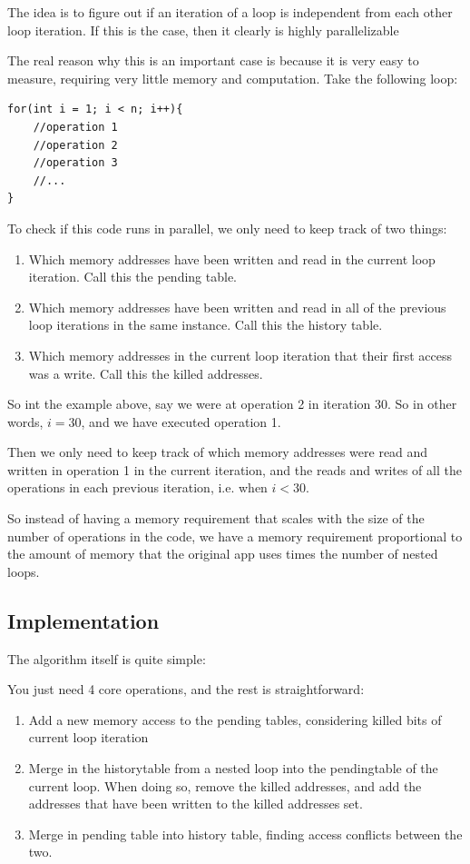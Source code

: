 \documentclass[12pt,twoside]{reedthesis}
\begin{document}
		The idea is to figure out if an iteration of a loop is independent from each other loop iteration. If this is the case, then it clearly is highly parallelizable

		The real reason why this is an important case is because it is very easy to measure, requiring very little memory and computation. Take the following loop:
\begin{lstlisting}
for(int i = 1; i < n; i++){
	//operation 1
	//operation 2
	//operation 3
	//...
}
\end{lstlisting}


		To check if this code runs in parallel, we only need to keep track of two things:

		\begin{enumerate}
			\item Which memory addresses have been written and read in the current loop iteration. Call this the pending table.
			\item Which memory addresses have been written and read in all of the previous loop iterations in the same instance. Call this the history table.
			\item Which memory addresses in the current loop iteration that their first access was a write. Call this the killed addresses.
		\end{enumerate}

		So int the example above, say we were at operation 2 in iteration 30. So in other words, $i=30$, and we have executed operation 1.

		Then we only need to keep track of which memory addresses were read and written in operation 1 in the current iteration, and the reads and writes of all the operations in each previous iteration, i.e. when $i < 30$.

		So instead of having a memory requirement that scales with the size of the number of operations in the code, we have a memory requirement proportional to the amount of memory that the original app uses times the number of nested loops.

		\subsection{Implementation}

		The algorithm itself is quite simple:

		You just need 4 core operations, and the rest is straightforward:

		\begin{enumerate}
			\item Add a new memory access to the pending tables, considering killed bits of current loop iteration
			\item Merge in the historytable from a nested loop into the pendingtable of the current loop. When doing so, remove the killed addresses, and add the addresses that have been written to the killed addresses set.
			\item Merge in pending table into history table, finding access conflicts between the two.
		\end{enumerate}
\end{document}
